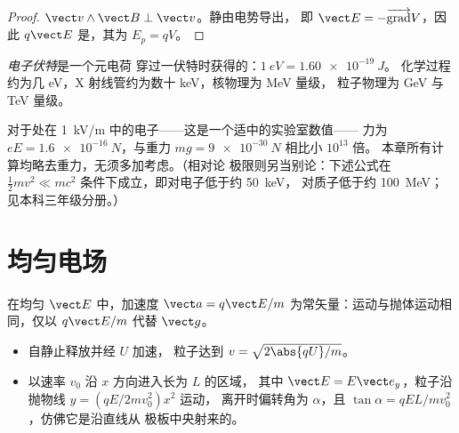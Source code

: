 \begin{proof}
$\vect v\wedge\vect B \perp \vect v$。静由电势导出，
即 $\vect E = -\overrightarrow{\operatorname{grad}}V$，因此 $q\vect E$
是，其为 $E_p = qV$。
\end{proof}

\begin{definition}[电子伏特]\label{def:b1:charged-particles:eV}
\emph{电子伏特}是一个元电荷
穿过一伏特时获得的：$\qty{1}{eV} = \qty{1.60e-19}{J}$。
化学过程约为几 eV，X 射线管约为数十 keV，核物理为 MeV 量级，
粒子物理为 GeV 与 TeV 量级。
\end{definition}

\begin{remark}[为何忽略重力]\label{rem:b1:charged-particles:gravity}
对于处在 \qty{1}{kV/m} 中的电子——这是一个适中的实验室数值——
力为 $eE = \qty{1.6e-16}{N}$，与重力
$mg = \qty{9e-30}{N}$ 相比小 $10^{13}$ 倍。
本章所有计算均略去重力，无须多加考虑。（相对论
极限则另当别论：下述公式在
$\tfrac12 mv^2 \ll mc^2$ 条件下成立，即对电子低于约 \qty{50}{keV}，
对质子低于约 \qty{100}{MeV}；见本科三年级分册。）
\end{remark}

\section{均匀电场}

\begin{proposition}[加速与偏转]\label{prop:b1:charged-particles:efield}
在均匀 $\vect E$ 中，加速度 $\vect a = q\vect E/m$
为常矢量：运动与抛体运动相同，仅以 $q\vect E/m$ 代替
$\vect g$。
\begin{itemize}
  \item 自静止释放并经 $U$ 加速，
        粒子达到 $v = \sqrt{2\abs{qU}/m}$。
  \item 以速率 $v_0$ 沿 $x$ 方向进入长为 $L$ 的区域，
        其中 $\vect E = E\vect e_y$，粒子沿抛物线 $y = (qE/2mv_0^2)x^2$ 运动，
        离开时偏转角为 $\alpha$，且 $\tan\alpha =
        qEL/mv_0^2$，仿佛它是沿直线从
        极板中央射来的。
\end{itemize}
\end{proposition}


